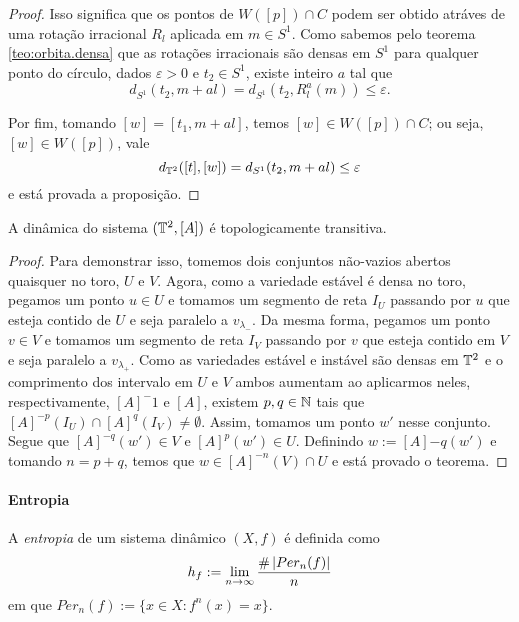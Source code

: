 \begin{proof}
Isso significa que os pontos de $W([p]) \cap C$ podem ser obtido atráves de uma rotação irracional $R_l$ aplicada em $m \in S^1$. Como sabemos pelo teorema \ref{teo:orbita.densa} que as rotações irracionais são densas em $S^1$ para qualquer ponto do círculo, dados $\varepsilon > 0$ e $t_2 \in S^1$, existe inteiro $a$ tal que
	\begin{equation*}
	d_{S^1}(t_2,m + al) = d_{S^1}(t_2,R_l^a(m)) \leq \varepsilon \text{.}
	\end{equation*}

Por fim, tomando $[w]=[t_1,m+al]$, temos $[w] \in W([p]) \cap C$; ou seja, $[w] \in W([p])$, vale
	\begin{equation*}
	d_{\mathbb{T}^2}([t],[w]) = d_{S^1}(t_2,m+al) \leq \varepsilon
	\end{equation*}
e está provada a proposição.
\end{proof}


\begin{theorem}
A dinâmica do sistema $(\mathbb{T}^2, [A])$ é topologicamente transitiva.
\end{theorem}
\begin{proof}
Para demonstrar isso, tomemos dois conjuntos não-vazios abertos quaisquer no toro, $U$ e $V$. Agora, como a variedade estável é densa no toro, pegamos um ponto $u \in U$ e tomamos um segmento de reta $I_U$ passando por $u$ que esteja contido de $U$ e seja paralelo a $v_{\lambda_-}$. Da mesma forma, pegamos um ponto $v \in V$ e tomamos um segmento de reta $I_V$ passando por $v$ que esteja contido em $V$ e seja paralelo a $v_{\lambda_+}$. Como as variedades estável e instável são densas em $\mathbb{T}^2$ e o comprimento dos intervalo em $U$ e $V$ ambos aumentam ao aplicarmos neles, respectivamente, $[A]^-1$ e $[A]$, existem $p,q \in \mathbb{N}$ tais que $[A]^{-p}(I_U) \cap [A]^q(I_V) \neq \emptyset$. Assim, tomamos um ponto $w'$ nesse conjunto. Segue que $[A]^{-q}(w') \in V$ e $[A]^p(w') \in U$. Definindo $w := [A]{-q}(w')$ e tomando $n=p+q$, temos que $w \in [A]^{-n}(V) \cap U$ e está provado o teorema.
\end{proof}


\paragraph{Entropia}

\begin{definition}
A \textit{entropia} de um sistema dinâmico $(X,f)$ é definida como
	\begin{equation*}
	h_f := \lim_{n \to \infty} \frac{\#\left\lvert{Per_n(f)}\right\rvert}{n}
	\end{equation*}
em que $Per_n(f) := \{x \in X : f^n(x)=x\}$.
\end{definition}

